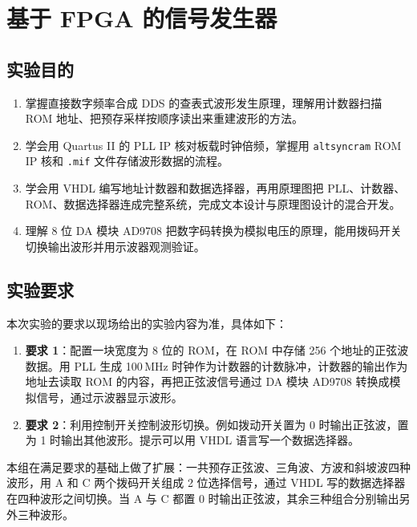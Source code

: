 \documentclass{ctexrep}
\begin{document}
\graphicspath{{../6. adda/figures/}}
\chapter{基于 FPGA 的信号发生器}

\section{实验目的}

\begin{enumerate}
    \item 掌握直接数字频率合成 DDS 的查表式波形发生原理，理解用计数器扫描 ROM 地址、把预存采样按顺序读出来重建波形的方法。
    \item 学会用 Quartus II 的 PLL IP 核对板载时钟倍频，掌握用 \texttt{altsyncram} ROM IP 核和 \texttt{.mif} 文件存储波形数据的流程。
    \item 学会用 VHDL 编写地址计数器和数据选择器，再用原理图把 PLL、计数器、ROM、数据选择器连成完整系统，完成文本设计与原理图设计的混合开发。
    \item 理解 8 位 DA 模块 AD9708 把数字码转换为模拟电压的原理，能用拨码开关切换输出波形并用示波器观测验证。
\end{enumerate}

\section{实验要求}

本次实验的要求以现场给出的实验内容为准，具体如下：

\begin{enumerate}
    \item \textbf{要求 1}：配置一块宽度为 8 位的 ROM，在 ROM 中存储 256 个地址的正弦波数据。用 PLL 生成 100\,MHz 时钟作为计数器的计数脉冲，计数器的输出作为地址去读取 ROM 的内容，再把正弦波信号通过 DA 模块 AD9708 转换成模拟信号，通过示波器显示波形。
    \item \textbf{要求 2}：利用控制开关控制波形切换。例如拨动开关置为 0 时输出正弦波，置为 1 时输出其他波形。提示可以用 VHDL 语言写一个数据选择器。
\end{enumerate}

本组在满足要求的基础上做了扩展：一共预存正弦波、三角波、方波和斜坡波四种波形，用 A 和 C 两个拨码开关组成 2 位选择信号，通过 VHDL 写的数据选择器在四种波形之间切换。当 A 与 C 都置 0 时输出正弦波，其余三种组合分别输出另外三种波形。
\end{document}
